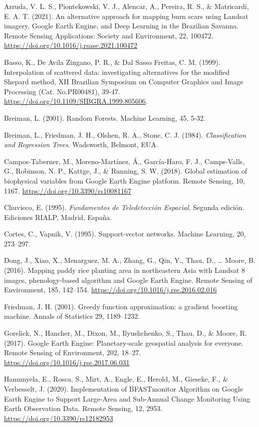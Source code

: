 \documentclass[
  12pt,
  letterpaper,
  twoside]{book}
\begin{document}
Arruda, V. L. S., Piontekowski, V. J., Alencar, A., Pereira, R. S., \& Matricardi, E. A. T. (2021). An alternative approach for mapping burn scars using Landsat imagery, Google Earth Engine, and Deep Learning in the Brazilian Savanna. Remote Sensing Applications: Society and Environment, 22, 100472. \url{https://doi.org/10.1016/j.rsase.2021.100472}

Basso, K., De Avila Zingano, P. R., \& Dal Sasso Freitas, C. M. (1999). Interpolation of scattered data: investigating alternatives for the modified Shepard method, XII Brazilian Symposium on Computer Graphics and Image Processing (Cat. No.PR00481), 39-47. \url{https://doi.org/10.1109/SIBGRA.1999.805606}.

Breiman, L. (2001). Random Forests. Machine Learning, 45, 5-32.

Breiman, L., Friedman, J. H., Olshen, R. A., Stone, C. J. (1984). \emph{Classification and Regression Trees}. Wadsworth, Belmont, EUA.

Campos-Taberner, M., Moreno-Martínez, Á., García-Haro, F. J., Camps-Valls, G., Robinson, N. P., Kattge, J., \& Running, S. W. (2018). Global estimation of biophysical variables from Google Earth Engine platform. Remote Sensing, 10, 1167. \url{https://doi.org/10.3390/rs10081167}

Chuvieco, E. (1995). \emph{Fundamentos de Teledetección Espacial}. Segunda edición. Ediciones RIALP, Madrid, España.

Cortes, C., Vapnik, V. (1995). Support-vector networks. Machine Learning, 20, 273--297.

Dong, J., Xiao, X., Menarguez, M. A., Zhang, G., Qin, Y., Thau, D., \ldots{} Moore, B. (2016). Mapping paddy rice planting area in northeastern Asia with Landsat 8 images, phenology-based algorithm and Google Earth Engine. Remote Sensing of Environment, 185, 142--154. \url{https://doi.org/10.1016/j.rse.2016.02.016}

Friedman, J. H. (2001). Greedy function approximation: a gradient boosting machine. Annals of Statistics 29, 1189--1232.

Gorelick, N., Hancher, M., Dixon, M., Ilyushchenko, S., Thau, D., \& Moore, R. (2017). Google Earth Engine: Planetary-scale geospatial analysis for everyone. Remote Sensing of Environment, 202, 18--27. \url{https://doi.org/10.1016/j.rse.2017.06.031}

Hamunyela, E., Rosca, S., Mirt, A., Engle, E., Herold, M., Gieseke, F., \& Verbesselt, J. (2020). Implementation of BFASTmonitor Algorithm on Google Earth Engine to Support Large-Area and Sub-Annual Change Monitoring Using Earth Observation Data. Remote Sensing, 12, 2953. \url{https://doi.org/10.3390/rs12182953}
\end{document}
